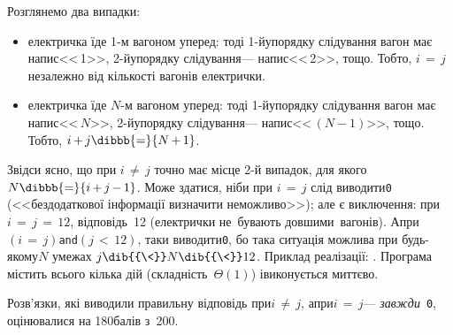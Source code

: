 \pagebreak[3] %

\Tutorial	Розглянемо два випадки: 

\begin{itemize}[leftmargin=*,itemsep=0pt,partopsep=0pt,topsep=0pt,parsep=0pt]
\item
електричка їде \mbox{1-м} вагоном уперед: тоді 
\mbox{1-й}\nolinebreak[2] у\nolinebreak[2] порядку слідування вагон має напис\nolinebreak[2] <<\textnumero$\,$1>>, 
\mbox{2-й}\nolinebreak[2] у\nolinebreak[2] порядку слідування\nolinebreak[3] --- напис\nolinebreak[2] <<\textnumero$\,$2>>, 
тощо. Тобто, ${i\,{=}\,j}$ незалежно від кількості вагонів електрички.
\item
електричка їде \mbox{$N$-м} вагоном уперед: тоді 
\mbox{1-й}\nolinebreak[3] у\nolinebreak[3] порядку слідування вагон має напис\nolinebreak[2] <<\textnumero$\,N$>>, 
\mbox{2-й}\nolinebreak[3] у\nolinebreak[3] порядку слідування\nolinebreak[3] --- напис\nolinebreak[2] <<\textnumero$\,(N{-}1)$>>, 
тощо. Тобто, ${i\,{+}\,j}\dibbb{{=}}{N\,{+}\,1}$.
\end{itemize}

Звідси ясно, що при ${i\,{\neq}\,j}$ точно має місце \mbox{2-й} випадок, для якого $N\dibbb{{=}}{i\,{+}\,j\,{-}\,1}$. Може здатися, ніби при ${i\,{=}\,j}$ слід виводити\nolinebreak[3] \texttt{0} (<<без\nolinebreak[1] додаткової інформації визначити неможливо>>); але є виключення: при ${i\,{=}\,j\,{=}\,12}$, відповідь~12 (електрички не~бувають довшими~вагонів). А\nolinebreak[3] при\nolinebreak[1] $({i\,{=}\,j})$\nolinebreak[3] \texttt{and}\nolinebreak[2] $({j\,{<}\,12})$, таки виводити\nolinebreak[3] \texttt{0}, бо така ситуація можлива при будь-якому\nolinebreak[3] $N$ 
у\nolinebreak[3] межах $j\dib{{\<}}N\dib{{\<}}12$.
Приклад реалізації: .
Програма містить всього кілька дій (складність~$\Theta(1)$) і\nolinebreak[3] виконується миттєво.

Розв'язки, які виводили правильну відповідь при\nolinebreak[2] ${i\,{\neq}\,j}$, а\nolinebreak[3] при\nolinebreak[2] ${i\,{=}\,j}$\nolinebreak[3] --- \mbox{\emph{завжди}}~\texttt{0}, оцінювалися на 180\nolinebreak[3] балів з~200.


